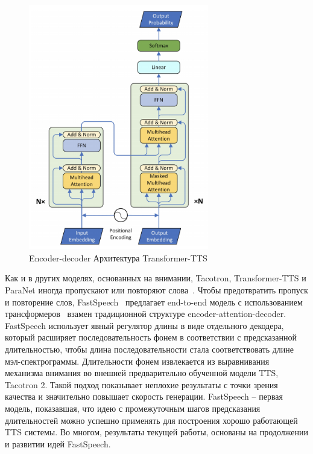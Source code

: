 \begin{figure}[!ht]
\centering
\includegraphics[width=0.7\textwidth]{images/related-work/transformer-tts.png}
\caption{Encoder-decoder Архитектура Transformer-TTS~\cite{transformer-tts}}
\label{fig:related-work:transformer-tts}
\end{figure}

Как и в других моделях, основанных на внимании, Tacotron, Transformer-TTS и ParaNet иногда пропускают или повторяют слова~\cite{paranet}. Чтобы предотвратить пропуск и повторение слов, FastSpeech~\cite{fastspeech} предлагает end-to-end модель с использованием трансформеров~\cite{attention-is-all} взамен традиционной структуре encoder-attention-decoder. FastSpeech использует явный регулятор длины в виде отдельного декодера, который расширяет последовательность фонем в соответствии с предсказанной длительностью, чтобы длина последовательности стала соответствовать длине мэл-спектро\-граммы. Длительности фонем извлекается из выравнивания механизма внимания во внешней предварительно обученной модели TTS, Tacotron 2.
Такой подход показывает неплохие результаты с точки зрения качества и значительно повышает скорость генерации. FastSpeech -- первая модель, показавшая, что идею с промежуточным шагов предсказания длительностей можно успешно применять для построения хорошо работающей TTS системы. Во многом, результаты текущей работы, основаны на продолжении и развитии идей FastSpeech.

